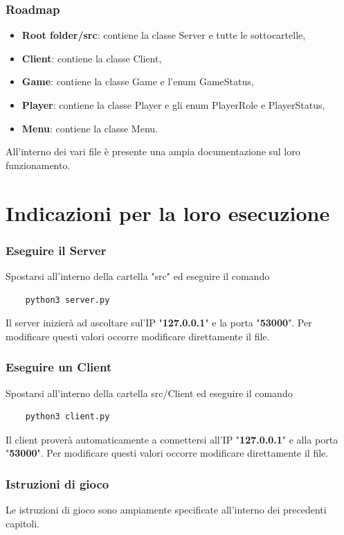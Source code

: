 \documentclass[a4paper,12pt]{report}
\begin{document}
\subsection{Roadmap}
\begin{itemize}
	\item \textbf{Root folder/src}: contiene la classe Server e tutte le sottocartelle,
	\item \textbf{Client}: contiene la classe Client,
	\item \textbf{Game}: contiene la classe Game e l'enum GameStatus,
	\item \textbf{Player}: contiene la classe Player e gli enum PlayerRole e PlayerStatus,
	\item \textbf{Menu}: contiene la classe Menu.
\end{itemize}
All'interno dei vari file è presente una ampia documentazione sul loro funzionamento.
\chapter{Indicazioni per la loro esecuzione}
\subsection{Eseguire il Server}
Spostarsi all'interno della cartella "src" ed eseguire il comando
\begin{verbatim}
	python3 server.py
\end{verbatim}
Il server inizierà ad ascoltare sul'IP "\textbf{127.0.0.1}" e la porta "\textbf{53000}". Per modificare questi valori occorre modificare direttamente il file.
\subsection{Eseguire un Client}
Spostarsi all'interno della cartella src/Client ed eseguire il comando
\begin{verbatim}
	python3 client.py
\end{verbatim}
Il client proverà automaticamente a connettersi all'IP "\textbf{127.0.0.1}" e alla porta "\textbf{53000}". Per modificare questi valori occorre modificare direttamente il file.
\subsection{Istruzioni di gioco}
Le istruzioni di gioco sono ampiamente specificate all'interno dei precedenti capitoli.
\end{document}
